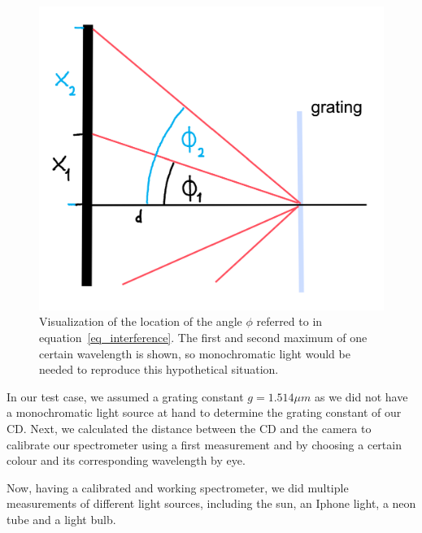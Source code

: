     \begin{figure}[H]
        \centering
        \includegraphics[scale = 0.7]{src/images/angle_phi.png}
        \caption{Visualization of the location of the angle $\phi$ referred to in equation~\eqref{eq_interference}.
        The first and second maximum of one certain wavelength is shown, so monochromatic light would be needed to reproduce this hypothetical situation.}
        \label{fig_phi}
    \end{figure}

    In our test case, we assumed a grating constant $g = 1.514 \mu m$ \cite{src_grating_constant} as we did not have a monochromatic light source at hand to determine the grating constant of our CD.
    Next, we calculated the distance between the CD and the camera to calibrate our spectrometer using a first measurement and by choosing a certain colour and its corresponding wavelength by eye.

    Now, having a calibrated and working spectrometer, we did multiple measurements of different light sources, including the sun, an Iphone light, a neon tube and a light bulb.

    